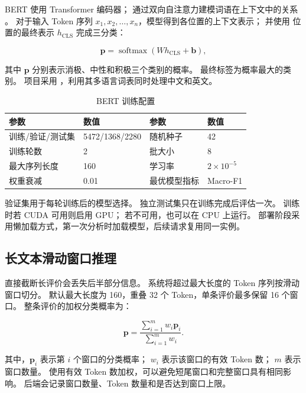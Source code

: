 BERT 使用 Transformer 编码器；
通过双向自注意力建模词语在上下文中的关系
\citep{devlin2019bert,vaswani2017attention}。
对于输入 Token 序列 \(x_1,x_2,\ldots,x_n\)，模型得到各位置的上下文表示；
并使用 \code{[CLS]} 位置的最终表示 \(h_{\mathrm{CLS}}\) 完成三分类：

\begin{equation}
  \boldsymbol{p}
  = \operatorname{softmax}\left(W h_{\mathrm{CLS}} + \boldsymbol{b}\right),
\end{equation}

其中 \(\boldsymbol{p}\) 分别表示消极、中性和积极三个类别的概率。
最终标签为概率最大的类别。
项目采用 ，利用其多语言词表同时处理中文和英文。

\begin{table}[H]
  \centering
  \caption{BERT 训练配置}
  \label{tab:bert-training}
  \small
  \begin{tabularx}{\textwidth}{L{3.2cm} Y L{3.2cm} Y}
    \toprule
    参数 & 数值 & 参数 & 数值 \\
    \midrule
    训练/验证/测试集 & 5472/1368/2280 &
    随机种子 & 42 \\
    训练轮数 & 2 &
    批大小 & 8 \\
    最大序列长度 & 160 &
    学习率 & \(2\times10^{-5}\) \\
    权重衰减 & 0.01 &
    最优模型指标 & Macro-F1 \\
    \bottomrule
  \end{tabularx}
\end{table}

验证集用于每轮训练后的模型选择。
独立测试集只在训练完成后评估一次。
训练时若 CUDA 可用则启用 GPU；
若不可用，也可以在 CPU 上运行。
部署阶段采用懒加载方式，第一次分析时加载模型，后续请求复用同一实例。

\subsection{长文本滑动窗口推理}

直接截断长评价会丢失后半部分信息。
系统将超过最大长度的 Token 序列按滑动窗口切分。
默认最大长度为 160，重叠 32 个 Token，单条评价最多保留 16 个窗口。
整条评价的加权分类概率为：

\begin{equation}
  \label{eq:weighted-window}
  \boldsymbol{p}
  = \frac{\sum_{i=1}^{m} w_i \boldsymbol{p}_i}
  {\sum_{i=1}^{m} w_i}.
\end{equation}

其中，\(\boldsymbol{p}_i\) 表示第 \(i\) 个窗口的分类概率；
\(w_i\) 表示该窗口的有效 Token 数；
\(m\) 表示窗口数量。
使用有效 Token 数加权，可以避免短尾窗口和完整窗口具有相同影响。
后端会记录窗口数量、Token 数量和是否达到窗口上限。

